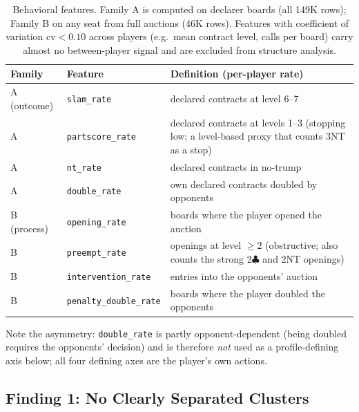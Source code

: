\documentclass[runningheads]{llncs}
\begin{document}
\begin{table}[h]
\centering\small
\caption{Behavioral features. Family A is computed on declarer boards
(all 149K rows); Family B on any seat from full auctions (46K rows).
Features with coefficient of variation $\mathrm{cv}<0.10$ across players
(e.g.\ mean contract level, calls per board) carry almost no
between-player signal and are excluded from structure analysis.}
\label{tab:features}
\begin{tabular}{llp{6.6cm}}
\toprule
Family & Feature & Definition (per-player rate)\\
\midrule
A (outcome) & \texttt{slam\_rate}      & declared contracts at level 6--7\\
A & \texttt{partscore\_rate} & declared contracts at levels 1--3 (stopping low; a level-based proxy that counts 3NT as a stop)\\
A & \texttt{nt\_rate}        & declared contracts in no-trump\\
A & \texttt{double\_rate}    & own declared contracts doubled by opponents\\
\midrule
B (process) & \texttt{opening\_rate}      & boards where the player opened the auction\\
B & \texttt{preempt\_rate}       & openings at level $\ge 2$ (obstructive; also counts the strong 2$\clubsuit$ and 2NT openings)\\
B & \texttt{intervention\_rate}  & entries into the opponents' auction\\
B & \texttt{penalty\_double\_rate} & boards where the player doubled the
opponents\footnotemark\\
\bottomrule
\end{tabular}
\end{table}

Note the asymmetry: \texttt{double\_rate} is partly
opponent-dependent (being doubled requires the opponents' decision) and
is therefore \emph{not} used as a profile-defining axis below; all four
defining axes are the player's own actions.

\subsection{Finding 1: No Clearly Separated Clusters}\label{sec:continuum}
\end{document}
